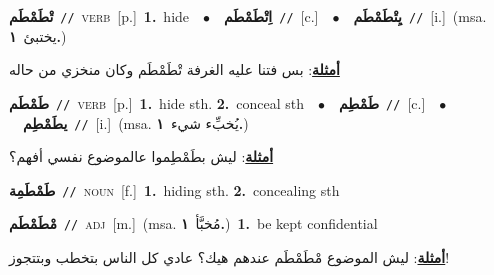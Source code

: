 \documentclass[10pt,a4paper,twoside]{article} %
\begin{document}
\begin{multicols}{2}
{\setlength\topsep{0pt}\textbf{\foreignlanguage{arabic}{تْطَمْطَم}}\ {\color{gray}\texttt{//}\color{black}}\ \textsc{verb}\ [p.]\ \textbf{1.}~hide\ \ $\bullet$\ \ \setlength\topsep{0pt}\textbf{\foreignlanguage{arabic}{اِتْطَمْطَم}}\ {\color{gray}\texttt{//}\color{black}}\ [c.]\ \ $\bullet$\ \ \setlength\topsep{0pt}\textbf{\foreignlanguage{arabic}{يِتْطَمْطَم}}\ {\color{gray}\texttt{//}\color{black}}\ [i.]\ \color{gray}(msa. \foreignlanguage{arabic}{يختبئ}~\foreignlanguage{arabic}{\textbf{١.}})\color{black}\  \begin{flushright}\color{gray}\foreignlanguage{arabic}{\textbf{\underline{\foreignlanguage{arabic}{أمثلة}}}: بس فتنا عليه الغرفة تْطَمْطَم وكان منخزي من حاله}\end{flushright}\color{black}} \vspace{2mm}

{\setlength\topsep{0pt}\textbf{\foreignlanguage{arabic}{طَمْطَم}}\ {\color{gray}\texttt{//}\color{black}}\ \textsc{verb}\ [p.]\ \textbf{1.}~hide sth.  \textbf{2.}~conceal sth\ \ $\bullet$\ \ \setlength\topsep{0pt}\textbf{\foreignlanguage{arabic}{طَمْطِم}}\ {\color{gray}\texttt{//}\color{black}}\ [c.]\ \ $\bullet$\ \ \setlength\topsep{0pt}\textbf{\foreignlanguage{arabic}{يطَمْطِم}}\ {\color{gray}\texttt{//}\color{black}}\ [i.]\ \color{gray}(msa. \foreignlanguage{arabic}{يُخبِّء شيء}~\foreignlanguage{arabic}{\textbf{١.}})\color{black}\  \begin{flushright}\color{gray}\foreignlanguage{arabic}{\textbf{\underline{\foreignlanguage{arabic}{أمثلة}}}: ليش بطَمْطِموا عالموضوع نفسي أفهم؟}\end{flushright}\color{black}} \vspace{2mm}

{\setlength\topsep{0pt}\textbf{\foreignlanguage{arabic}{طَمْطَمِة}}\ {\color{gray}\texttt{//}\color{black}}\ \textsc{noun}\ [f.]\ \textbf{1.}~hiding sth.  \textbf{2.}~concealing sth\ } \vspace{2mm}

{\setlength\topsep{0pt}\textbf{\foreignlanguage{arabic}{مْطَمْطَم}}\ {\color{gray}\texttt{//}\color{black}}\ \textsc{adj}\ [m.]\ \color{gray}(msa. \foreignlanguage{arabic}{مُخبَّأ}~\foreignlanguage{arabic}{\textbf{١.}})\color{black}\ \textbf{1.}~be kept confidential\  \begin{flushright}\color{gray}\foreignlanguage{arabic}{\textbf{\underline{\foreignlanguage{arabic}{أمثلة}}}: ليش الموضوع مْطَمْطَم عندهم هيك؟ عادي كل الناس بتخطب وبتتجوز!}\end{flushright}\color{black}} \vspace{2mm}


\end{multicols}
\end{document}
